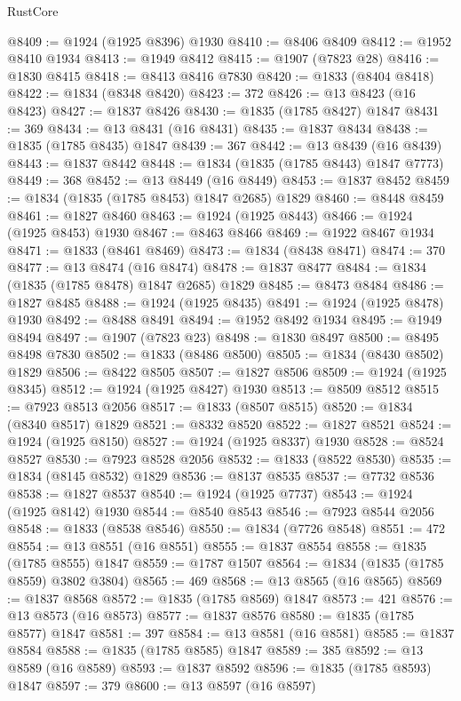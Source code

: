 \begin{lexlean}{RustCore}
\begin{coremodule}
@8409 := @1924 (@1925 @8396) @1930
@8410 := @8406 @8409
@8412 := @1952 @8410 @1934
@8413 := @1949 @8412
@8415 := @1907 (@7823 @28)
@8416 := @1830 @8415
@8418 := @8413 @8416 @7830
@8420 := @1833 (@8404 @8418)
@8422 := @1834 (@8348 @8420)
@8423 := 372
@8426 := @13 @8423 (@16 @8423)
@8427 := @1837 @8426
@8430 := @1835 (@1785 @8427) @1847
@8431 := 369
@8434 := @13 @8431 (@16 @8431)
@8435 := @1837 @8434
@8438 := @1835 (@1785 @8435) @1847
@8439 := 367
@8442 := @13 @8439 (@16 @8439)
@8443 := @1837 @8442
@8448 := @1834 (@1835 (@1785 @8443) @1847 @7773)
@8449 := 368
@8452 := @13 @8449 (@16 @8449)
@8453 := @1837 @8452
@8459 := @1834 (@1835 (@1785 @8453) @1847 @2685) @1829
@8460 := @8448 @8459
@8461 := @1827 @8460
@8463 := @1924 (@1925 @8443)
@8466 := @1924 (@1925 @8453) @1930
@8467 := @8463 @8466
@8469 := @1922 @8467 @1934
@8471 := @1833 (@8461 @8469)
@8473 := @1834 (@8438 @8471)
@8474 := 370
@8477 := @13 @8474 (@16 @8474)
@8478 := @1837 @8477
@8484 := @1834 (@1835 (@1785 @8478) @1847 @2685) @1829
@8485 := @8473 @8484
@8486 := @1827 @8485
@8488 := @1924 (@1925 @8435)
@8491 := @1924 (@1925 @8478) @1930
@8492 := @8488 @8491
@8494 := @1952 @8492 @1934
@8495 := @1949 @8494
@8497 := @1907 (@7823 @23)
@8498 := @1830 @8497
@8500 := @8495 @8498 @7830
@8502 := @1833 (@8486 @8500)
@8505 := @1834 (@8430 @8502) @1829
@8506 := @8422 @8505
@8507 := @1827 @8506
@8509 := @1924 (@1925 @8345)
@8512 := @1924 (@1925 @8427) @1930
@8513 := @8509 @8512
@8515 := @7923 @8513 @2056
@8517 := @1833 (@8507 @8515)
@8520 := @1834 (@8340 @8517) @1829
@8521 := @8332 @8520
@8522 := @1827 @8521
@8524 := @1924 (@1925 @8150)
@8527 := @1924 (@1925 @8337) @1930
@8528 := @8524 @8527
@8530 := @7923 @8528 @2056
@8532 := @1833 (@8522 @8530)
@8535 := @1834 (@8145 @8532) @1829
@8536 := @8137 @8535
@8537 := @7732 @8536
@8538 := @1827 @8537
@8540 := @1924 (@1925 @7737)
@8543 := @1924 (@1925 @8142) @1930
@8544 := @8540 @8543
@8546 := @7923 @8544 @2056
@8548 := @1833 (@8538 @8546)
@8550 := @1834 (@7726 @8548)
@8551 := 472
@8554 := @13 @8551 (@16 @8551)
@8555 := @1837 @8554
@8558 := @1835 (@1785 @8555) @1847
@8559 := @1787 @1507
@8564 := @1834 (@1835 (@1785 @8559) @3802 @3804)
@8565 := 469
@8568 := @13 @8565 (@16 @8565)
@8569 := @1837 @8568
@8572 := @1835 (@1785 @8569) @1847
@8573 := 421
@8576 := @13 @8573 (@16 @8573)
@8577 := @1837 @8576
@8580 := @1835 (@1785 @8577) @1847
@8581 := 397
@8584 := @13 @8581 (@16 @8581)
@8585 := @1837 @8584
@8588 := @1835 (@1785 @8585) @1847
@8589 := 385
@8592 := @13 @8589 (@16 @8589)
@8593 := @1837 @8592
@8596 := @1835 (@1785 @8593) @1847
@8597 := 379
@8600 := @13 @8597 (@16 @8597)

\end{coremodule}
\end{lexlean}
